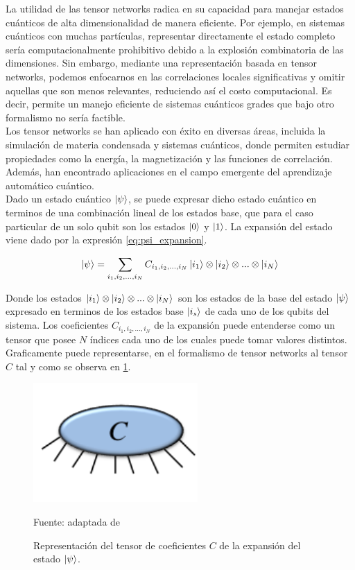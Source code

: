 La utilidad de las tensor networks radica en su capacidad para manejar estados cuánticos de alta dimensionalidad de manera eficiente. Por ejemplo, en sistemas cuánticos con muchas partículas, representar directamente el estado completo sería computacionalmente prohibitivo debido a la explosión combinatoria de las dimensiones. Sin embargo, mediante una representación basada en tensor networks, podemos enfocarnos en las correlaciones locales significativas y omitir aquellas que son menos relevantes, reduciendo así el costo computacional. Es decir, permite un manejo eficiente de sistemas cuánticos grades que bajo otro formalismo no sería factible. \\


Los tensor networks se han aplicado con éxito en diversas áreas, incluida la simulación de materia condensada y sistemas cuánticos, donde permiten estudiar propiedades como la energía, la magnetización y las funciones de correlación. Además, han encontrado aplicaciones en el campo emergente del aprendizaje automático cuántico. \\

Dado un estado cuántico $\ket{\psi}$, se puede expresar dicho estado cuántico en terminos de una combinación lineal de los estados base, que para el caso particular de un solo qubit son los estados $\ket{0}$ y $\ket{1}$. La expansión del estado viene dado por la expresión \ref{eq:psi_expansion}.

\begin{equation}
    \ket{\psi} = \sum_{i_1, i_2, ...,i_N} C_{i_1, i_2, ...,i_N} \ket{i_1}\otimes\ket{i_2}\otimes...\otimes \ket{i_N}
    \label{eq:psi_expansion}
\end{equation}

Donde los estados $\ket{i_1}\otimes\ket{i_2}\otimes...\otimes \ket{i_N}$ son los estados de la base del estado $\ket{\psi}$ expresado en terminos de los estados base $\ket{i_s}$ de cada uno de los qubits del sistema. Los coeficientes $C_{i_1, i_2, ...,i_N}$ de la expansión puede entenderse como un tensor que posee $N$ índices cada uno de los cuales puede tomar valores distintos. Graficamente puede representarse, en el formalismo de tensor networks al tensor $C$ tal y como se observa en \ref{fig:orus}.

\begin{figure}[!ht]
    \centering
    \includegraphics[scale = 0.8]{img/03_tensor_coeficientes.png}
    \caption{Representación del tensor de coeficientes $C$  de la expansión del estado $\ket{\psi}$.}
    Fuente: adaptada de \citep{orus}
    \label{fig:orus}
\end{figure}

